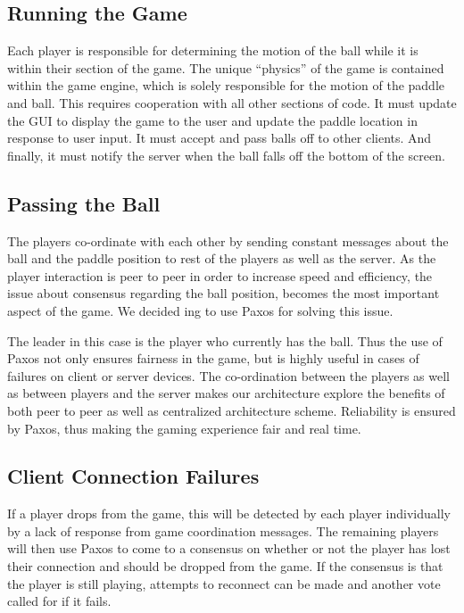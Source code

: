\documentclass{sig-alternate}
\begin{document}
\subsection{Running the Game}

Each player is responsible for determining the motion of the ball while it
is within their section of the game.  The unique ``physics'' of the game is
contained within the game engine, which is solely responsible for the
motion of the paddle and ball.  This requires cooperation with all other
sections of code.  It must update the GUI to display the game to the user
and update the paddle location in response to user input.  It must accept
and pass balls off to other clients.  And finally, it must notify the
server when the ball falls off the bottom of the screen.  

\subsection{Passing the Ball}

The players co-ordinate with each other by sending constant messages about
the ball and the paddle position to rest of the players as well as the
server. As the player interaction is peer to peer in order to increase
speed and efficiency, the issue about consensus regarding the ball
position, becomes the most important aspect of the game. We decided ing to
use Paxos\cite{lamport:paxos} for solving this issue.

The leader in this case is the player who currently has the ball. Thus the
use of Paxos not only ensures fairness in the game, but is highly useful in
cases of failures on client or server devices. The co-ordination between
the players as well as between players and the server makes our
architecture explore the benefits of both peer to peer as well as
centralized architecture scheme.  Reliability is ensured by Paxos, thus
making the gaming experience fair and real time.

\subsection{Client Connection Failures}

If a player drops from the game, this will be detected by each player
individually by a lack of response from game coordination messages. The
remaining players will then use Paxos to come to a consensus on whether or
not the player has lost their connection and should be dropped from the
game.  If the consensus is that the player is still playing, attempts to
reconnect can be made and another vote called for if it fails.
\end{document}
